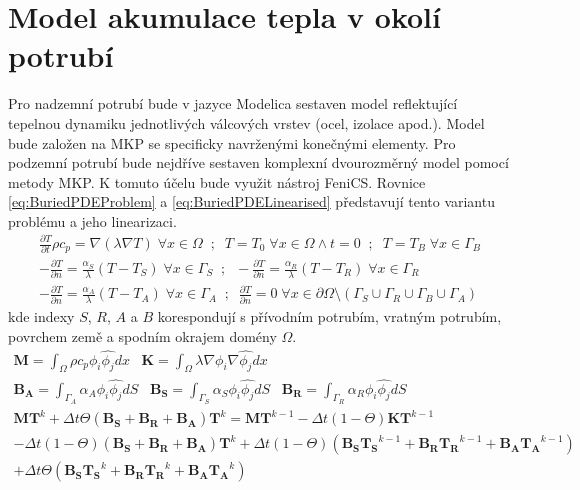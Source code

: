 \section{Model akumulace tepla v okolí potrubí}
\label{sec:PipeAcu}
Pro nadzemní potrubí bude v jazyce Modelica sestaven model reflektující
tepelnou dynamiku jednotlivých válcových vrstev (ocel, izolace apod.). Model
bude založen na MKP se specificky navrženými konečnými elementy. Pro
podzemní potrubí bude nejdříve sestaven komplexní dvourozměrný model pomocí
metody MKP. K tomuto účelu bude využit nástroj FeniCS. Rovnice
\ref{eq:BuriedPDEProblem} a \ref{eq:BuriedPDELinearised} představují tento
variantu problému a jeho linearizaci. 
\begin{equation}
  \label{eq:BuriedPDEProblem}
  \begin{gathered}
    \frac{\partial{T}}{\partial{t}}\rho c_p = \nabla(\lambda\nabla T)\;
    \forall{x} \in\Omega\;\;;\;\;
    T = T_0\;\forall{x}\in\Omega \land t=0\;\;;\;\;
    T=T_B\;\forall{x}\in\Gamma_B \\
    -\frac{\partial{T}}{\partial{n}}=\frac{\alpha_S}{\lambda}(T-T_S)\;
    \forall{x}\in\Gamma_S \;\;;\;\;
    -\frac{\partial{T}}{\partial{n}}=\frac{\alpha_R}{\lambda}(T-T_R)\;
    \forall{x}\in\Gamma_R \\
    -\frac{\partial{T}}{\partial{n}}=\frac{\alpha_A}{\lambda}(T-T_A)\;
    \forall{x}\in\Gamma_A \;\;;\;\;
    \frac{\partial{T}}{\partial{n}}=0\;\forall{x}\in\partial\Omega \setminus
    (\Gamma_S \cup \Gamma_R \cup \Gamma_B \cup \Gamma_A)
  \end{gathered}
\end{equation}
kde indexy \(S\), \(R\), \(A\) a \(B\) korespondují s přívodním potrubím, vratným
potrubím, povrchem země a spodním okrajem domény \(\Omega\).
\begin{equation}
  \label{eq:BuriedPDELinearised}
  \begin{gathered}
    \boldsymbol{M}=\int_\Omega\rho c_p\phi_i \hat{\phi_j}dx\;\;\;
    \boldsymbol{K}=\int_\Omega\lambda\nabla\phi_i\nabla\hat{\phi_j}dx\;\;\;\\
    \boldsymbol{B_A}=\int_{\Gamma_A}\alpha_A\phi_i\hat{\phi_j}dS\;\;\;
    \boldsymbol{B_S}=\int_{\Gamma_S}\alpha_S\phi_i\hat{\phi_j}dS\;\;\;
    \boldsymbol{B_R}=\int_{\Gamma_R}\alpha_R\phi_i\hat{\phi_j}dS\;\;\;\\
    \boldsymbol{MT}^k+\Delta{t}\Theta(\boldsymbol{B_S}+\boldsymbol{B_R}+
    \boldsymbol{B_A})\boldsymbol{T}^k
    =\boldsymbol{MT}^{k-1}-\Delta{t}(1-\Theta)\boldsymbol{KT}^{k-1}\\
    -\Delta{t}(1-\Theta)(\boldsymbol{B_S}+\boldsymbol{B_R}+\boldsymbol{B_A})\boldsymbol{T}^k
    +\Delta{t}(1-\Theta)(\boldsymbol{B_ST_S}^{k-1}+\boldsymbol{B_RT_R}^{k-1}+
    \boldsymbol{B_AT_A}^{k-1})\\+\Delta{t}\Theta(\boldsymbol{B_ST_S}^k
    +\boldsymbol{B_RT_R}^k+\boldsymbol{B_AT_A}^k)
  \end{gathered}
\end{equation}
